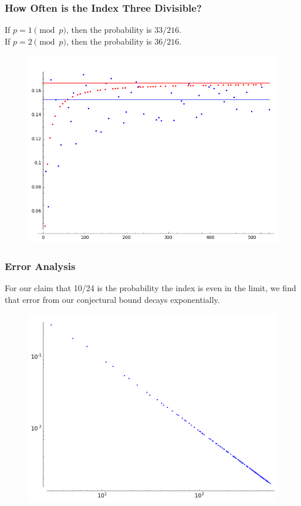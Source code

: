 \documentclass{beamer}
\begin{document}
\begin{frame}
\frametitle{How Often is the Index Three Divisible?}
If $p = 1 \pmod p$, then the probability is $33/216$. \\
If $p = 2 \pmod p$, then the probability is $36/216$.
\begin{figure}[H]
\centering
\includegraphics[width=.8\textwidth]{divisibility_three}
\end{figure}
\end{frame}

\begin{frame}
\frametitle{Error Analysis}
For our claim that 10/24 is the probability the 
index is even in the limit, we find that error 
from our conjectural bound decays exponentially.
\begin{figure}[H]
\centering
\includegraphics[width=.8\textwidth]{divisibility_claim_1}
\end{figure}
\end{frame}
\end{document}
